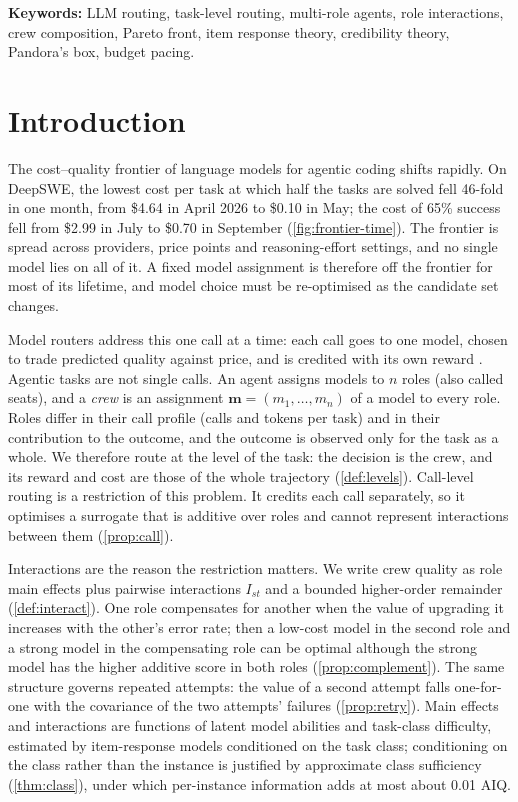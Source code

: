 \documentclass[11pt,a4paper]{article}
\theoremstyle{definition}
\theoremstyle{remark}
\theoremstyle{definition}
\newcommand{\crew}{\mathbf{m}}
\begin{document}
\vspace{2pt}
\noindent\textbf{Keywords:} LLM routing, task-level routing, multi-role agents, role interactions, crew composition, Pareto front, item response theory, credibility theory, Pandora's box, budget pacing.

\section{Introduction}

The cost--quality frontier of language models for agentic coding shifts rapidly. On DeepSWE, the lowest cost per task at which half the tasks are solved fell 46-fold in one month, from \$4.64 in April 2026 to \$0.10 in May; the cost of 65\% success fell from \$2.99 in July to \$0.70 in September (\cref{fig:frontier-time}). The frontier is spread across providers, price points and reasoning-effort settings, and no single model lies on all of it. A fixed model assignment is therefore off the frontier for most of its lifetime, and model choice must be re-optimised as the candidate set changes.

Model routers address this one call at a time: each call goes to one model, chosen to trade predicted quality against price, and is credited with its own reward \cite{ong2024routellm,ding2024hybrid,chen2023frugalgpt,madaan2024automix}. Agentic tasks are not single calls. An agent assigns models to $n$ roles (also called seats), and a \emph{crew} is an assignment $\crew=(m_1,\dots,m_n)$ of a model to every role. Roles differ in their call profile (calls and tokens per task) and in their contribution to the outcome, and the outcome is observed only for the task as a whole. We therefore route at the level of the task: the decision is the crew, and its reward and cost are those of the whole trajectory (\cref{def:levels}). Call-level routing is a restriction of this problem. It credits each call separately, so it optimises a surrogate that is additive over roles and cannot represent interactions between them (\cref{prop:call}).

Interactions are the reason the restriction matters. We write crew quality as role main effects plus pairwise interactions $I_{st}$ and a bounded higher-order remainder (\cref{def:interact}). One role compensates for another when the value of upgrading it increases with the other's error rate; then a low-cost model in the second role and a strong model in the compensating role can be optimal although the strong model has the higher additive score in both roles (\cref{prop:complement}). The same structure governs repeated attempts: the value of a second attempt falls one-for-one with the covariance of the two attempts' failures (\cref{prop:retry}). Main effects and interactions are functions of latent model abilities and task-class difficulty, estimated by item-response models conditioned on the task class; conditioning on the class rather than the instance is justified by approximate class sufficiency (\cref{thm:class}), under which per-instance information adds at most about 0.01 AIQ.
\end{document}
